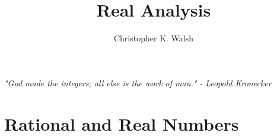 \documentclass[12pt,openany]{book}
\title{Real Analysis}
\author{Christopher K. Walsh}
\theoremstyle{mydefinitionstyle}
\theoremstyle{myexamplestyle}
\theoremstyle{remark}
\begin{document}
\maketitle
\tableofcontents

\vspace{10mm}
\begin{center}
    \textit{"God made the integers; all else is the work of man."}
    \textit{- Leopold Kronecker}
\end{center}


\chapter{Rational and Real Numbers}



\end{document}
